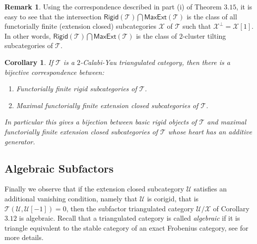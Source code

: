 \documentclass[oneside, a4paper,reqno]{amsart}
\numberwithin{equation}{section}
\newtheorem{cor}[thm]{Corollary}
\theoremstyle{definition}
\newtheorem{rem}[thm]{Remark}
\begin{document}
\begin{rem} Using the correspondence described in part (i) of Theorem $3.15$, it is easy to see that the intersection  $\mathsf{Rigid}({\mathcal T}) \bigcap \mathsf{MaxExt}({\mathcal T})$ is the class of all functorially finite (extension closed) subcategories ${\mathcal X}$ of ${\mathcal T}$ such that ${\mathcal X}^{\bot} = {\mathcal X}[1]$. In other words,  $\mathsf{Rigid}({\mathcal T}) \bigcap \mathsf{MaxExt}({\mathcal T})$ is the class of $2$-cluster tilting subcategories of ${\mathcal T}$.  
\end{rem} 

\begin{cor} If ${\mathcal T}$ is a $2$-Calabi-Yau triangulated category, then there is a bijective correspondence between: 
\begin{enumerate}
\item  Functorially finite rigid subcategories of ${\mathcal T}$.
\item Maximal functorially finite extension closed subcategories of ${\mathcal T}$. 
\end{enumerate}
In particular this gives a bijection between basic rigid objects of ${\mathcal T}$ and maximal functorially finite extension closed subcategories of ${\mathcal T}$ whose heart has an additive generator. 
\end{cor} 

\subsection{Algebraic Subfactors} Finally we observe that if the extension closed subcategory ${\mathcal U}$ satisfies an additional vanishing condition, namely that ${\mathcal U}$ is corigid, that is ${\mathcal T}({\mathcal U},{\mathcal U}[-1]) = 0$, then the subfactor triangulated category ${\mathcal U}/{\mathcal X}$ of Corollary $3.12$ is algebraic. Recall that a triangulated category is called {\em algebraic} if it is triangle equivalent to the stable category of an exact Frobenius category, see \cite{Happel} for more details.  
\end{document}
